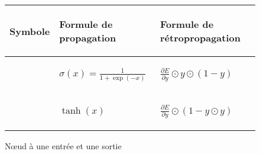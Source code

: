 \begin{figure}[h!]
\begin{center}
\begin{tabular}{|m{4cm}|m{}|m{}|}
\hline
\begin{center}Symbole\end{center} & \begin{center}Formule de propagation\end{center} & \begin{center}Formule de rétropropagation\end{center} \\
\hline
\begin{center}\end{center} & \begin{center}$\sigma(x) = \frac{1}{1 + \exp(-x)}$\end{center} & \begin{center}$\frac{\partial E}{\partial y} \odot y \odot (1 - y)$\end{center} \\
\hline
\begin{center}\end{center} & \begin{center}$\tanh(x)$\end{center} & \begin{center}$\frac{\partial E}{\partial y} \odot (1 - y \odot y)$\end{center} \\ 
\hline
\end{tabular}
\end{center}
\caption{N\oe{}ud à une entrée et une sortie}
\end{figure}

